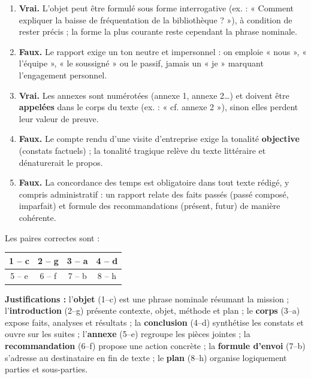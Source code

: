 \documentclass[11pt]{article}
\newcommand{\cle}[1]{{\popxbold\color{popdark}#1}}
\begin{document}
\begin{corrige}
\begin{enumerate}
    \item \textbf{Vrai.} L'objet peut être formulé sous forme interrogative (ex. : « Comment expliquer la baisse de fréquentation de la bibliothèque ? »), à condition de rester précis ; la forme la plus courante reste cependant la phrase nominale.
    \item \textbf{Faux.} Le rapport exige un ton \cle{neutre et impersonnel} : on emploie « nous », « l'équipe », « le soussigné » ou le passif, jamais un « je » marquant l'engagement personnel.
    \item \textbf{Vrai.} Les annexes sont numérotées (annexe 1, annexe 2\ldots) et doivent être \textbf{appelées} dans le corps du texte (ex. : « cf. annexe 2 »), sinon elles perdent leur valeur de preuve.
    \item \textbf{Faux.} Le compte rendu d'une visite d'entreprise exige la tonalité \textbf{objective} (constats factuels) ; la tonalité tragique relève du texte littéraire et dénaturerait le propos.
    \item \textbf{Faux.} La \cle{concordance des temps} est obligatoire dans tout texte rédigé, y compris administratif : un rapport relate des faits passés (passé composé, imparfait) et formule des recommandations (présent, futur) de manière cohérente.
\end{enumerate}
\end{corrige}

\begin{corrige}
Les paires correctes sont :
\begin{center}
\begin{tabular}{|c|c|c|c|}\hline
1 -- c & 2 -- g & 3 -- a & 4 -- d \\\hline
5 -- e & 6 -- f & 7 -- b & 8 -- h \\\hline
\end{tabular}
\end{center}
\textbf{Justifications :} l'\textbf{objet} (1--c) est une phrase nominale résumant la mission ; l'\textbf{introduction} (2--g) présente contexte, objet, méthode et plan ; le \textbf{corps} (3--a) expose faits, analyses et résultats ; la \textbf{conclusion} (4--d) synthétise les constats et ouvre sur les suites ; l'\textbf{annexe} (5--e) regroupe les pièces jointes ; la \textbf{recommandation} (6--f) propose une action concrète ; la \textbf{formule d'envoi} (7--b) s'adresse au destinataire en fin de texte ; le \textbf{plan} (8--h) organise logiquement parties et sous-parties.
\end{corrige}
\end{document}
